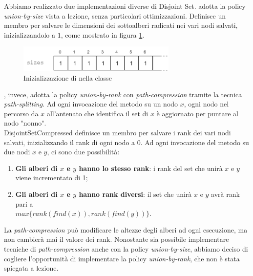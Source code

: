 \noindent Abbiamo realizzato due implementazioni diverse di Disjoint Set.
 adotta la policy \textit{union-by-size} vista a lezione, senza particolari ottimizzazioni. Definisce un membro  per salvare le dimensioni dei sottoalberi radicati nei vari nodi salvati, inizializzandolo a 1, come mostrato in figura \ref{fig:disjoint-set-sizes}.

\begin{figure}[htbp]
	\centering
    \includegraphics[width=0.7\textwidth]{./images/DisjointSetSizesVector.png}
	\caption{Inizializzazione di  nella classe }
	\label{fig:disjoint-set-sizes}
\end{figure}

\noindent {}, invece, adotta la policy \textit{union-by-rank} con \textit{path-compression} tramite la tecnica \textit{path-splitting}.
Ad ogni invocazione del metodo  su un nodo $x$, ogni nodo nel percorso da $x$ all'antenato che identifica il set di $x$ è aggiornato per puntare al nodo "nonno". \\
\noindent DisjointSetCompressed definisce un membro  per salvare i rank dei vari nodi salvati, inizializzando il rank di ogni nodo a 0. Ad ogni invocazione del metodo  su due nodi $x$ e $y$, ci sono due possibilità:

\begin{enumerate}
    \item \textbf{Gli alberi di $x$ e $y$ hanno lo stesso rank}: i rank del set che unirà $x$ e $y$ viene incrementato di 1;
    \item \textbf{Gli alberi di $x$ e $y$ hanno rank diversi}: il set che unirà $x$ e $y$ avrà rank pari a \\ $max\{ rank(find(x)), rank(find(y)) \}$.
\end{enumerate}

\noindent La \textit{path-compression} può modificare le altezze degli alberi ad ogni esecuzione, ma non cambierà mai il valore dei rank.
Nonostante sia possibile implementare tecniche di \textit{path-compression} anche con la policy \textit{union-by-size}, abbiamo deciso di cogliere l'opportunità di implementare la policy \textit{union-by-rank}, che non è stata spiegata a lezione. \\

